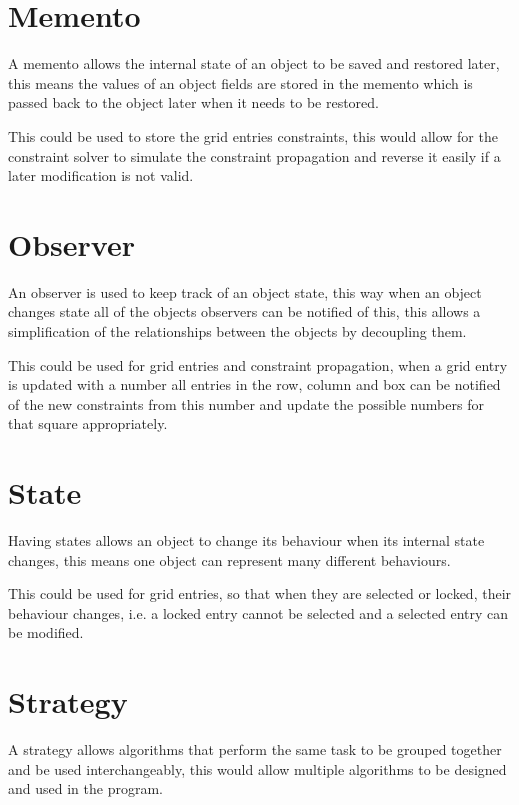 \documentclass[]{final_report}
\begin{document}
\section*{Memento}

A memento allows the internal state of an object to be saved and restored later, this means the values of an object fields are stored in the memento which is passed back to the object later when it needs to be restored.

This could be used to store the grid entries constraints, this would allow for the constraint solver to simulate the constraint propagation and reverse it easily if a later modification is not valid.

\section*{Observer}

An observer is used to keep track of an object state, this way when an object changes state all of the objects observers can be notified of this, this allows a simplification of the relationships between the objects by decoupling them.

This could be used for grid entries and constraint propagation, when a grid entry is updated with a number all entries in the row, column and box can be notified of the new constraints from this number and update the possible numbers for that square appropriately.

\section*{State}

Having states allows an object to change its behaviour when its internal state changes, this means one object can represent many different behaviours.

This could be used for grid entries, so that when they are selected or locked, their behaviour changes, i.e. a locked entry cannot be selected and a selected entry can be modified.

\section*{Strategy}

A strategy allows algorithms that perform the same task to be grouped together and be used interchangeably, this would allow multiple algorithms to be designed and used in the program.
\end{document}
